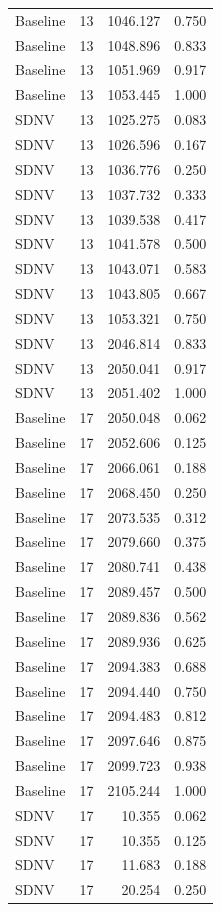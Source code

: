 \begin{table}[t]
\begin{tabular}{lrrr}
Baseline & 13 & 1046.127 & 0.750\\
Baseline & 13 & 1048.896 & 0.833\\
Baseline & 13 & 1051.969 & 0.917\\
Baseline & 13 & 1053.445 & 1.000\\
SDNV & 13 & 1025.275 & 0.083\\
SDNV & 13 & 1026.596 & 0.167\\
SDNV & 13 & 1036.776 & 0.250\\
SDNV & 13 & 1037.732 & 0.333\\
SDNV & 13 & 1039.538 & 0.417\\
SDNV & 13 & 1041.578 & 0.500\\
SDNV & 13 & 1043.071 & 0.583\\
SDNV & 13 & 1043.805 & 0.667\\
SDNV & 13 & 1053.321 & 0.750\\
SDNV & 13 & 2046.814 & 0.833\\
SDNV & 13 & 2050.041 & 0.917\\
SDNV & 13 & 2051.402 & 1.000\\
Baseline & 17 & 2050.048 & 0.062\\
Baseline & 17 & 2052.606 & 0.125\\
Baseline & 17 & 2066.061 & 0.188\\
Baseline & 17 & 2068.450 & 0.250\\
Baseline & 17 & 2073.535 & 0.312\\
Baseline & 17 & 2079.660 & 0.375\\
Baseline & 17 & 2080.741 & 0.438\\
Baseline & 17 & 2089.457 & 0.500\\
Baseline & 17 & 2089.836 & 0.562\\
Baseline & 17 & 2089.936 & 0.625\\
Baseline & 17 & 2094.383 & 0.688\\
Baseline & 17 & 2094.440 & 0.750\\
Baseline & 17 & 2094.483 & 0.812\\
Baseline & 17 & 2097.646 & 0.875\\
Baseline & 17 & 2099.723 & 0.938\\
Baseline & 17 & 2105.244 & 1.000\\
SDNV & 17 & 10.355 & 0.062\\
SDNV & 17 & 10.355 & 0.125\\
SDNV & 17 & 11.683 & 0.188\\
SDNV & 17 & 20.254 & 0.250\\

\end{tabular}
\end{table}
